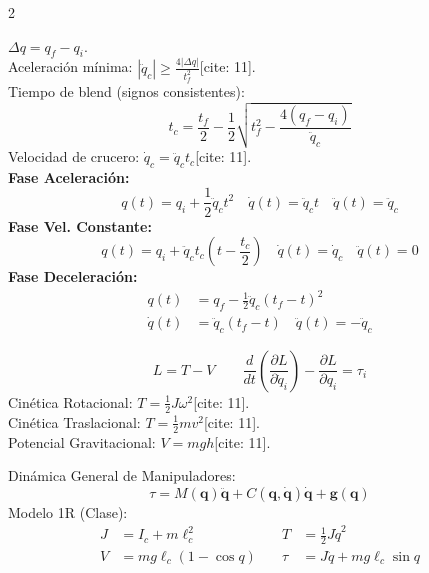 \documentclass[10pt, a4paper]{article}
\begin{document}
\begin{multicols*}{2}
\begin{tcolorbox}[sectionbox, title=LSPB (Vel. Inicial/Final Nula){[cite: 11]}]
$\Delta q = q_f - q_i$. \\
Aceleración mínima: $\boxed{ |\ddot{q}_c| \ge \frac{4|\Delta q|}{t_f^2} }$[cite: 11]. \\
Tiempo de blend (signos consistentes):
\begin{equation*}
    t_c = \frac{t_f}{2} - \frac{1}{2} \sqrt{ t_f^2 - \frac{4(q_f - q_i)}{\ddot{q}_c} }
\end{equation*}
Velocidad de crucero: $\dot{q}_c = \ddot{q}_c t_c$[cite: 11]. \\
\textbf{Fase Aceleración:}
\begin{equation*}
    q(t) = q_i + \frac{1}{2}\ddot{q}_c t^2 \quad \dot{q}(t) = \ddot{q}_c t \quad \ddot{q}(t) = \ddot{q}_c
\end{equation*}
\textbf{Fase Vel. Constante:}
\begin{equation*}
    q(t) = q_i + \ddot{q}_c t_c \left( t - \frac{t_c}{2} \right) \quad \dot{q}(t) = \dot{q}_c \quad \ddot{q}(t) = 0
\end{equation*}
\textbf{Fase Deceleración:}
\begin{align*}
    q(t) &= q_f - \frac{1}{2}\ddot{q}_c (t_f - t)^2 \\
    \dot{q}(t) &= \ddot{q}_c (t_f - t) \quad \ddot{q}(t) = -\ddot{q}_c
\end{align*}
\end{tcolorbox}

\begin{tcolorbox}[sectionbox, title=Energía y Lagrange{[cite: 11]}]
\begin{equation*}
    L = T - V \qquad \frac{d}{dt} \left( \frac{\partial L}{\partial \dot{q}_i} \right) - \frac{\partial L}{\partial q_i} = \tau_i
\end{equation*}
Cinética Rotacional: $T = \frac{1}{2}J\omega^2$[cite: 11]. \\
Cinética Traslacional: $T = \frac{1}{2}mv^2$[cite: 11]. \\
Potencial Gravitacional: $V = mgh$[cite: 11].
\end{tcolorbox}

\begin{tcolorbox}[sectionbox, title=Dinámica General y Modelo 1R{[cite: 11]}]
Dinámica General de Manipuladores:
\begin{equation*}
    \tau = M(\mathbf{q})\ddot{\mathbf{q}} + C(\mathbf{q},\dot{\mathbf{q}})\dot{\mathbf{q}} + \mathbf{g}(\mathbf{q})
\end{equation*}
Modelo 1R (Clase):
\begin{align*}
    J &= I_c + m\ell_c^2 \quad &T &= \frac{1}{2}J\dot{q}^2 \\
    V &= mg\ell_c(1 - \cos q) \quad &\tau &= J\ddot{q} + mg\ell_c\sin q
\end{align*}
\end{tcolorbox}


\end{multicols*}
\end{document}
